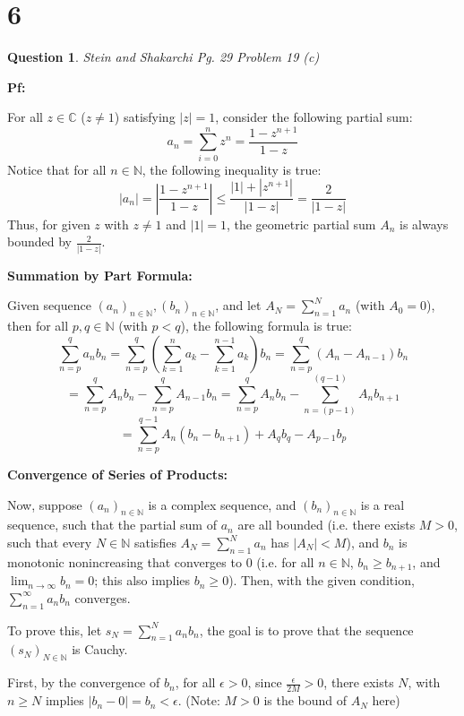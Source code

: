 \documentclass{article}
\newtheorem{question}{Question}
\begin{document}
\break

\section*{6}
\begin{question}
    Stein and Shakarchi Pg. 29 Problem 19 (c)
\end{question}

\textbf{Pf:}

For all $z\in\mathbb{C}$ ($z\neq 1$) satisfying $|z|=1$, consider the following partial sum:
$$a_n = \sum_{i=0}^{n}z^n = \frac{1-z^{n+1}}{1-z}$$
Notice that for all $n\in\mathbb{N}$, the following inequality is true:
$$|a_n|=\left|\frac{1-z^{n+1}}{1-z}\right|\leq \frac{|1|+|z^{n+1}|}{|1-z|} = \frac{2}{|1-z|}$$
Thus, for given $z$ with $z\neq 1$ and $|1|=1$, the geometric partial sum $A_n$ is always bounded by $\frac{2}{|1-z|}$.

\hfill

\textbf{Summation by Part Formula:}

Given sequence $(a_n)_{n\in\mathbb{N}},(b_n)_{n\in\mathbb{N}}$, and let $A_N=\sum_{n=1}^{N}a_n$ (with $A_0=0$),
then for all $p,q\in\mathbb{N}$ (with $p<q$), the following formula is true:
$$\sum_{n=p}^{q}a_nb_n = \sum_{n=p}^{q}\left(\sum_{k=1}^{n}a_k-\sum_{k=1}^{n-1}a_k\right)b_n = \sum_{n=p}^{q}(A_n-A_{n-1})b_n$$
$$ = \sum_{n=p}^{q}A_nb_n-\sum_{n=p}^{q}A_{n-1}b_n = \sum_{n=p}^{q}A_nb_n-\sum_{n=(p-1)}^{(q-1)}A_{n}b_{n+1} $$
$$ = \sum_{n=p}^{q-1}A_n(b_n-b_{n+1})+A_qb_q-A_{p-1}b_{p}$$

\hfill

\textbf{Convergence of Series of Products:}

Now, suppose $(a_n)_{n\in\mathbb{N}}$ is a complex sequence, and $(b_n)_{n\in\mathbb{N}}$ is a real sequence, such that the partial sum of $a_n$ are all bounded
(i.e. there exists $M>0$, such that every $N\in\mathbb{N}$ satisfies $A_N=\sum_{n=1}^{N}a_n$ has $|A_N|<M$), and $b_n$ is monotonic 
nonincreasing that converges to $0$ (i.e. for all $n\in\mathbb{N}$, $b_n\geq b_{n+1}$, and $\lim_{n\rightarrow\infty}b_n=0$; this also implies $b_n\geq 0$). Then, with the given condition, $\sum_{n=1}^{\infty}a_nb_n$ converges.

\hfill

To prove this, let $s_N = \sum_{n=1}^{N}a_nb_n$, the goal is to prove that the sequence $(s_N)_{N\in\mathbb{N}}$ is Cauchy.

First, by the convergence of $b_n$, for all $\epsilon>0$, since $\frac{\epsilon}{2M}>0$, there exists $N$, with $n\geq N$ implies $|b_n-0|=b_n<\epsilon$. (Note: $M>0$ is the bound of $A_N$ here)
\end{document}
